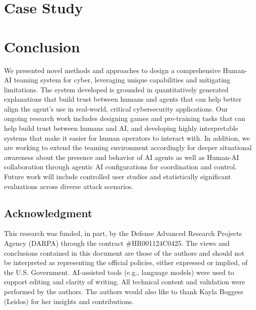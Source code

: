 \section{Case Study}


\section{Conclusion}
We presented novel methods and approaches to design a comprehensive Human-AI teaming
system for cyber, leveraging unique capabilities and mitigating limitations.
The system developed is grounded in quantitatively generated explanations that
build trust between humans and agents that can help better align the agent's use
in real-world, critical cybersecurity applications.
Our ongoing research work includes designing games and pre-training tasks that can
help build trust between humans and AI, and developing highly interpretable systems
that make it easier for human operators to interact with.
In addition, we are working to extend the teaming environment accordingly for deeper
situational awareness about the presence and behavior of AI agents as well as
Human-AI collaboration through agentic AI configurations for coordination and control.
Future work will include controlled user studies and statistically significant
evaluations across diverse attack scenarios.

\subsection*{Acknowledgment}
This research was funded, in part, by the Defense Advanced Research Projects Agency
(DARPA) through the contract \#HR001124C0425. The views and conclusions contained
in this document are those of the authors and should not be interpreted as representing
the official policies, either expressed or implied, of the U.S. Government.
AI-assisted tools (e.g., language models) were used to support editing and clarity
of writing. All technical content and validation were performed by the authors.
The authors would also like to thank Kayla Boggess (Leidos) for her insights and
contributions.

